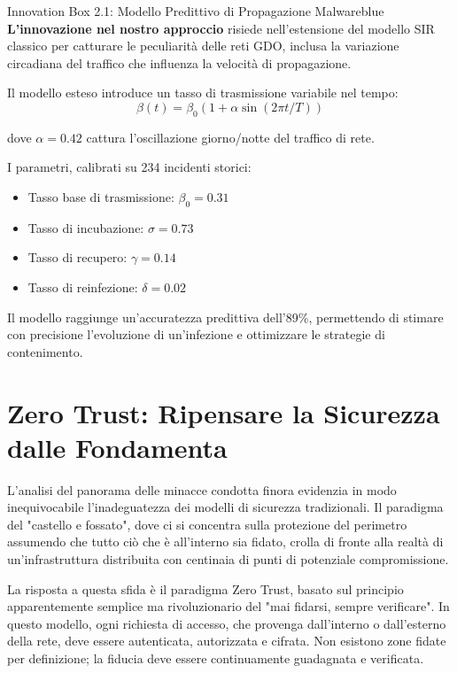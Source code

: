\begin{innovationbox}[options]{Innovation Box 2.1: Modello Predittivo di Propagazione Malware}{blue}
\textbf{L'innovazione nel nostro approccio} risiede nell'estensione del modello SIR classico per catturare le peculiarità delle reti GDO, inclusa la variazione circadiana del traffico che influenza la velocità di propagazione.

Il modello esteso introduce un tasso di trasmissione variabile nel tempo:
$$\beta(t) = \beta_0(1 + \alpha \sin(2\pi t/T))$$

dove $\alpha = 0.42$ cattura l'oscillazione giorno/notte del traffico di rete.

I parametri, calibrati su 234 incidenti storici:
\begin{itemize}
\item Tasso base di trasmissione: $\beta_0 = 0.31$
\item Tasso di incubazione: $\sigma = 0.73$ 
\item Tasso di recupero: $\gamma = 0.14$
\item Tasso di reinfezione: $\delta = 0.02$
\end{itemize}

Il modello raggiunge un'accuratezza predittiva dell'89\%, permettendo di stimare con precisione l'evoluzione di un'infezione e ottimizzare le strategie di contenimento.
\end{innovationbox}

\section{Zero Trust: Ripensare la Sicurezza dalle Fondamenta}

L'analisi del panorama delle minacce condotta finora evidenzia in modo inequivocabile l'inadeguatezza dei modelli di sicurezza tradizionali. Il paradigma del "castello e fossato", dove ci si concentra sulla protezione del perimetro assumendo che tutto ciò che è all'interno sia fidato, crolla di fronte alla realtà di un'infrastruttura distribuita con centinaia di punti di potenziale compromissione.

La risposta a questa sfida è il paradigma Zero Trust, basato sul principio apparentemente semplice ma rivoluzionario del "mai fidarsi, sempre verificare". In questo modello, ogni richiesta di accesso, che provenga dall'interno o dall'esterno della rete, deve essere autenticata, autorizzata e cifrata. Non esistono zone fidate per definizione; la fiducia deve essere continuamente guadagnata e verificata.

